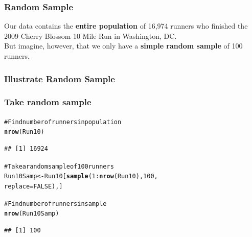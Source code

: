 \documentclass{beamer}\usepackage{graphicx, color}
\makeatletter
\newcommand{\hlfunctioncall}[1]{\textcolor[rgb]{0.501960784313725,0,0.329411764705882}{\textbf{#1}}}%
\newcommand{\hlcomment}[1]{\textcolor[rgb]{0.180392156862745,0.6,0.341176470588235}{#1}}%
\newenvironment{kframe}{%
 \def\at@end@of@kframe{}%
 \ifinner\ifhmode%
  \def\at@end@of@kframe{\end{minipage}}%
  \begin{minipage}{\columnwidth}%
 \fi\fi%
 \def\FrameCommand##1{\hskip\@totalleftmargin \hskip-\fboxsep
 \colorbox{shadecolor}{##1}\hskip-\fboxsep
     \hskip-\linewidth \hskip-\@totalleftmargin \hskip\columnwidth}%
 \MakeFramed {\advance\hsize-\width
   \@totalleftmargin\z@ \linewidth\hsize
   \@setminipage}}%
 {\par\unskip\endMakeFramed%
 \at@end@of@kframe}
\newenvironment{knitrout}{}{} %
\makeatother
\begin{document}
\begin{frame}[fragile]
  \frametitle{Random Sample}
{\large{Our data contains the {\bf{entire population}} of 16,974 runners who finished the 2009 Cherry Blossom 10 Mile Run in Washington, DC. \\[0.5cm]
  But imagine, however, that we only have a {\bf{simple random sample}} of 100 runners.}}
\end{frame}

\begin{frame}[fragile]
  \frametitle{Illustrate Random Sample}
\begin{knitrout}
\color{fgcolor}

{\centering {}

}


\end{knitrout}

\end{frame}

\begin{frame}[fragile]
  \frametitle{Take random sample}
\begin{knitrout}
\color{fgcolor}\begin{kframe}
\begin{alltt}
\hlcomment{# Find number of runners in population}
\hlfunctioncall{nrow}(Run10)
\end{alltt}
\begin{verbatim}
## [1] 16924
\end{verbatim}
\begin{alltt}

\hlcomment{# Take a random sample of 100 runners}
Run10Samp <- Run10[\hlfunctioncall{sample}(1:\hlfunctioncall{nrow}(Run10), 100,
                          replace=FALSE),]

\hlcomment{# Find number of runners in sample}
\hlfunctioncall{nrow}(Run10Samp)
\end{alltt}
\begin{verbatim}
## [1] 100
\end{verbatim}
\end{kframe}
\end{knitrout}

\end{frame}
\end{document}

